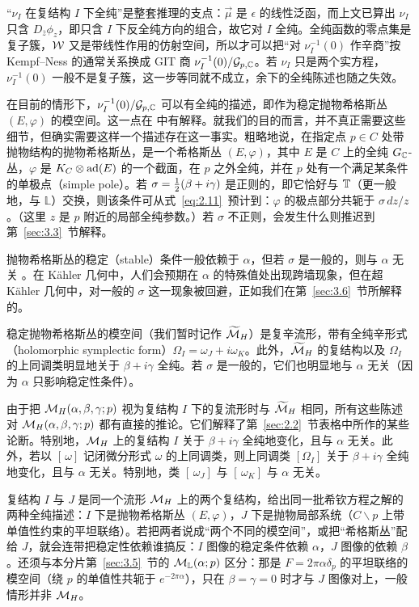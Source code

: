 \begin{yizhu}[含糊点拨]
“$\nu_I$ 在复结构 $I$ 下全纯”是整套推理的支点：$\vec\mu$ 是 $\epsilon$ 的线性泛函，而上文已算出 $\nu_I$ 只含 $D_{\bar z}\phi_z$，即只含 $I$ 下反全纯方向的组合，故它对 $I$ 全纯。全纯函数的零点集是复子簇，$\mathcal{W}$ 又是带线性作用的仿射空间，所以才可以把“对 $\nu_I^{-1}(0)$ 作辛商”按 Kempf--Ness 的通常关系换成 GIT 商 $\nu_I^{-1}(0)/\mathcal{G}_{p,{\mathbb{C}}}$。若 $\nu_I$ 只是两个实方程，$\nu_I^{-1}(0)$ 一般不是复子簇，这一步等同就不成立，余下的全纯陈述也随之失效。
\end{yizhu}

在目前的情形下，$\nu_I^{-1}(0)/\mathcal{G}_{p,{\mathbb{C}}}$ 可以有全纯的描述，即作为稳定抛物希格斯丛 $(E,\varphi)$ 的模空间。这一点在 \cite{ref22,ref23} 中有解释。就我们的目的而言，并不真正需要这些细节，但确实需要这样一个描述存在这一事实。粗略地说，在指定点 $p\in C$ 处带抛物结构的抛物希格斯丛，是一个希格斯丛
$(E,\varphi)$，其中 $E$ 是 $C$ 上的全纯 $G_{\mathbb{C}}$-丛，$\varphi$
是 $K_C\otimes {\rm ad}(E)$ 的一个截面，在 $p$ 之外全纯，并在 $p$ 处有一个满足某条件的单极点（simple pole）。若 $\sigma=\frac{1}{2}(\beta+i\gamma)$ 是正则的，即它恰好与 ${\mathbb{T}}$（更一般地，与 $\mathbb{L}$）交换，则该条件可从式~\eqref{eq:2.11}\ 预计到：$\varphi$ 的极点部分共轭于 $\sigma\,dz/z$。（这里 $z$ 是 $p$ 附近的局部全纯参数。）若 $\sigma$ 不正则，会发生什么则推迟到第~\ref{sec:3.3}~节解释。

抛物希格斯丛的稳定（stable）条件一般依赖于 $\alpha$，但若 $\sigma$ 是一般的，则与 $\alpha$ 无关 \cite{ref24}。在 Kähler 几何中，人们会预期在 $\alpha$ 的特殊值处出现跨墙现象，但在超 Kähler 几何中，对一般的 $\sigma$ 这一现象被回避，正如我们在第~\ref{sec:3.6}~节所解释的。

稳定抛物希格斯丛的模空间（我们暂时记作 $\widetilde{{\mathcal{M}}}_H$）是复辛流形，带有全纯辛形式（holomorphic symplectic form）$\Omega_I=\omega_J+i\omega_K$。此外，$\widetilde{{\mathcal{M}}}_H$ 的复结构以及 $\Omega_I$ 的上同调类明显地关于 $\beta+i\gamma$ 全纯。若 $\sigma$ 是一般的，它们也明显地与 $\alpha$ 无关（因为 $\alpha$ 只影响稳定性条件）。

由于把 ${{\mathcal{M}}_H}(\alpha,\beta,\gamma;p)$ 视为复结构 $I$ 下的复流形时与 $\widetilde{{\mathcal{M}}}_H$ 相同，所有这些陈述对 ${{\mathcal{M}}_H}(\alpha,\beta,\gamma;p)$ 都有直接的推论。它们解释了第~\ref{sec:2.2}~节表格中所作的某些论断。特别地，${{\mathcal{M}}_H}$ 上的复结构 $I$ 关于 $\beta+i\gamma$ 全纯地变化，且与 $\alpha$ 无关。此外，若以 $[\,\omega]$ 记闭微分形式 $\omega$ 的上同调类，则上同调类 $[\Omega_I]$ 关于 $\beta+i\gamma$ 全纯地变化，且与 $\alpha$ 无关。特别地，类 $[\,\omega_J]$ 与 $[\,\omega_K]$ 与 $\alpha$ 无关。

\begin{yizhu}[易错点]
复结构 $I$ 与 $J$ 是同一个流形 ${{\mathcal{M}}_H}$ 上的两个复结构，给出同一批希钦方程之解的两种全纯描述：$I$ 下是抛物希格斯丛 $(E,\varphi)$，$J$ 下是抛物局部系统（$C\backslash p$ 上带单值性约束的平坦联络）。若把两者说成“两个不同的模空间”，或把“希格斯丛”配给 $J$，就会连带把稳定性依赖谁搞反：$I$ 图像的稳定条件依赖 $\alpha$，$J$ 图像的依赖 $\beta$。还须与本分片第~\ref{sec:3.5}~节的 ${\mathcal{M}}_\mathbb{L}(\alpha;p)$ 区分：那是 $F=2\pi\alpha\delta_p$ 的平坦联络的模空间（绕 $p$ 的单值性共轭于 $e^{-2\pi\alpha}$），只在 $\beta=\gamma=0$ 时才与 $J$ 图像对上，一般情形并非 ${{\mathcal{M}}_H}$。
\end{yizhu}

